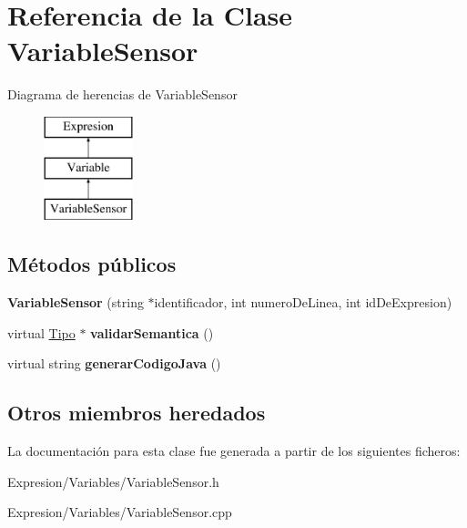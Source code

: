 \hypertarget{class_variable_sensor}{\section{Referencia de la Clase Variable\-Sensor}
\label{class_variable_sensor}
}
Diagrama de herencias de Variable\-Sensor\begin{figure}[H]
\begin{center}
\leavevmode
\includegraphics[height=3.000000cm]{class_variable_sensor}
\end{center}
\end{figure}
\subsection*{Métodos públicos}
\begin{DoxyCompactItemize}
\item 
\hypertarget{class_variable_sensor_a750c8f9f69803a629a08a2a06f43c843}{{\bfseries Variable\-Sensor} (string $\ast$identificador, int numero\-De\-Linea, int id\-De\-Expresion)}\label{class_variable_sensor_a750c8f9f69803a629a08a2a06f43c843}

\item 
\hypertarget{class_variable_sensor_ad52a28939ebdb651baf324ee133906f0}{virtual \hyperlink{class_tipo}{Tipo} $\ast$ {\bfseries validar\-Semantica} ()}\label{class_variable_sensor_ad52a28939ebdb651baf324ee133906f0}

\item 
\hypertarget{class_variable_sensor_aaacf409ee55cd8db8671bf345894e30a}{virtual string {\bfseries generar\-Codigo\-Java} ()}\label{class_variable_sensor_aaacf409ee55cd8db8671bf345894e30a}

\end{DoxyCompactItemize}
\subsection*{Otros miembros heredados}


La documentación para esta clase fue generada a partir de los siguientes ficheros\-:\begin{DoxyCompactItemize}
\item 
Expresion/\-Variables/Variable\-Sensor.\-h\item 
Expresion/\-Variables/Variable\-Sensor.\-cpp\end{DoxyCompactItemize}
